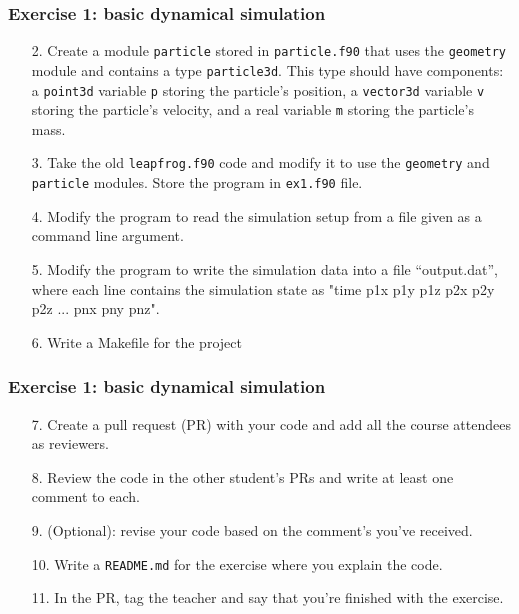 \begin{frame}
  \frametitle{Exercise 1: basic dynamical simulation}

  \begin{enumerate}
   \item[2.] Create a module \texttt{particle} stored in \texttt{particle.f90} that uses the \texttt{geometry} module and contains a type \texttt{particle3d}. This type should have components: a \texttt{point3d} variable \texttt{p} storing the particle's position, a \texttt{vector3d} variable \texttt{v} storing the particle's velocity, and a real variable \texttt{m} storing the particle's mass.
   \item[3.] Take the old \texttt{leapfrog.f90} code and modify it to use the \texttt{geometry} and \texttt{particle} modules. Store the program in \texttt{ex1.f90} file.
   \item[4.] Modify the program to read the simulation setup from a file given as a command line argument.
   \item[5.] Modify the program to write the simulation data into a file “output.dat”, where each line contains the simulation state as "time p1x p1y p1z p2x p2y p2z ... pnx pny pnz".
   \item[6.] Write a Makefile for the project
  \end{enumerate}
  \end{frame}



\begin{frame}
  \frametitle{Exercise 1: basic dynamical simulation}

  \begin{enumerate}
   \item[7.] Create a pull request (PR) with your code and add all the course attendees as reviewers.
   \item[8.] Review the code in the other student's PRs and write at least one comment to each.
   \item[9.] (Optional): revise your code based on the comment's you've received.
   \item[10.] Write a \texttt{README.md} for the exercise where you explain the code.
   \item[11.] In the PR, tag the teacher and say that you're finished with the exercise.
  \end{enumerate}
  \end{frame}


